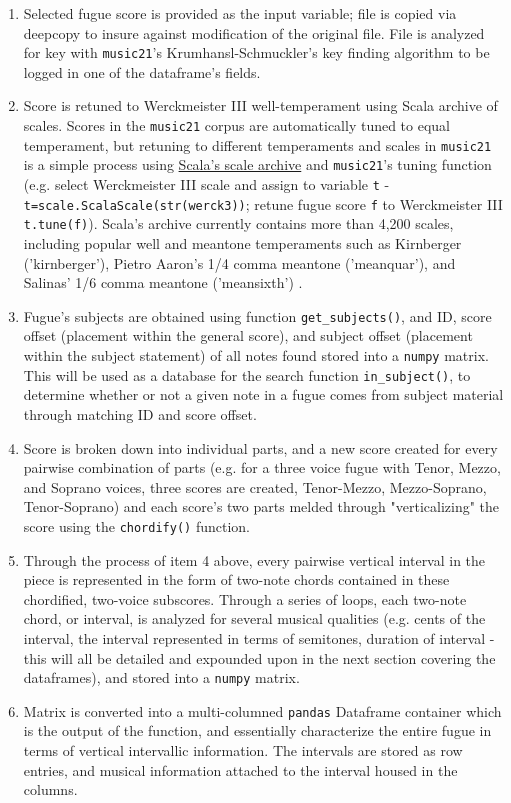 \begin{enumerate}
\def\labelenumi{\arabic{enumi}.}
\tightlist
\item
  Selected fugue score is provided as the input variable; file is copied
  via deepcopy to insure against modification of the original file. File
  is analyzed for key with \texttt{music21}'s Krumhansl-Schmuckler's key
  finding algorithm to be logged in one of the dataframe's fields.
\item
  Score is retuned to Werckmeister III well-temperament using Scala
  archive of scales. Scores in the \texttt{music21} corpus are
  automatically tuned to equal temperament, but retuning to different
  temperaments and scales in \texttt{music21} is a simple process using
  \href{http://www.huygens-fokker.org/docs/scalesdir.txt}{Scala's scale
  archive} and \texttt{music21}'s tuning function (e.g. select
  Werckmeister III scale and assign to variable \texttt{t} -
  \texttt{t=scale.ScalaScale(str(\textquotesingle{}werck3\textquotesingle{}))};
  retune fugue score \texttt{f} to Werckmeister III \texttt{t.tune(f)}).
  Scala's archive currently contains more than 4,200 scales, including
  popular well and meantone temperaments such as Kirnberger
  ('kirnberger'), Pietro Aaron's 1/4 comma meantone ('meanquar'), and
  Salinas' 1/6 comma meantone ('meansixth') .
\item
  Fugue's subjects are obtained using function \texttt{get\_subjects()},
  and ID, score offset (placement within the general score), and subject
  offset (placement within the subject statement) of all notes found
  stored into a \texttt{numpy} matrix. This will be used as a database
  for the search function \texttt{in\_subject()}, to determine whether
  or not a given note in a fugue comes from subject material through
  matching ID and score offset.
\item
  Score is broken down into individual parts, and a new score created
  for every pairwise combination of parts (e.g. for a three voice fugue
  with Tenor, Mezzo, and Soprano voices, three scores are created,
  Tenor-Mezzo, Mezzo-Soprano, Tenor-Soprano) and each score's two parts
  melded through "verticalizing" the score using the \texttt{chordify()}
  function.
\item
  Through the process of item 4 above, every pairwise vertical interval
  in the piece is represented in the form of two-note chords contained
  in these chordified, two-voice subscores. Through a series of loops,
  each two-note chord, or interval, is analyzed for several musical
  qualities (e.g. cents of the interval, the interval represented in
  terms of semitones, duration of interval - this will all be detailed
  and expounded upon in the next section covering the dataframes), and
  stored into a \texttt{numpy} matrix.
\item
  Matrix is converted into a multi-columned \texttt{pandas} Dataframe
  container which is the output of the function, and essentially
  characterize the entire fugue in terms of vertical intervallic
  information. The intervals are stored as row entries, and musical
  information attached to the interval housed in the columns.
\end{enumerate}

